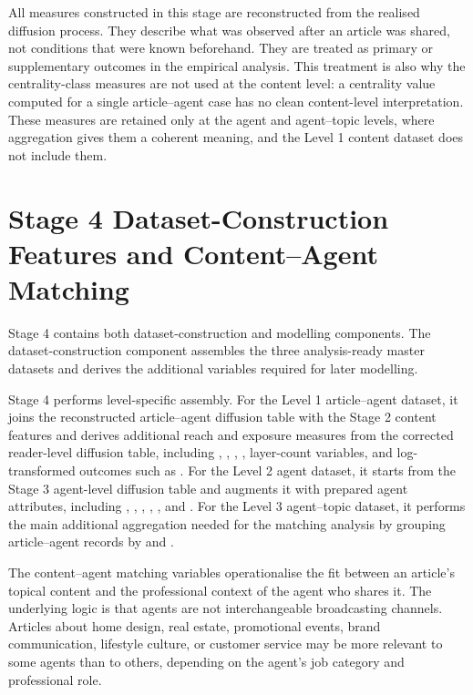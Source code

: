 All measures constructed in this stage are reconstructed from the realised diffusion process. They describe what was observed after an article was shared, not conditions that were known beforehand. They are treated as primary or supplementary outcomes in the empirical analysis. This treatment is also why the centrality-class measures are not used at the content level: a centrality value computed for a single article–agent case has no clean content-level interpretation. These measures are retained only at the agent and agent–topic levels, where aggregation gives them a coherent meaning, and the Level 1 content dataset does not include them.

\section{Stage 4 Dataset-Construction Features and Content–Agent Matching}
\label{sec:4-5-stage-4-dataset-construction-features-and-content-agent-matching}

Stage 4 contains both dataset-construction and modelling components. The dataset-construction component assembles the three analysis-ready master datasets and derives the additional variables required for later modelling.

Stage 4 performs level-specific assembly. For the Level 1 article–agent dataset, it joins the reconstructed article–agent diffusion table with the Stage 2 content features and derives additional reach and exposure measures from the corrected reader-level diffusion table, including , , , , layer-count variables, and log-transformed outcomes such as . For the Level 2 agent dataset, it starts from the Stage 3 agent-level diffusion table and augments it with prepared agent attributes, including , , , , , and . For the Level 3 agent–topic dataset, it performs the main additional aggregation needed for the matching analysis by grouping article–agent records by  and .

The content–agent matching variables operationalise the fit between an article's topical content and the professional context of the agent who shares it. The underlying logic is that agents are not interchangeable broadcasting channels. Articles about home design, real estate, promotional events, brand communication, lifestyle culture, or customer service may be more relevant to some agents than to others, depending on the agent's job category and professional role.

